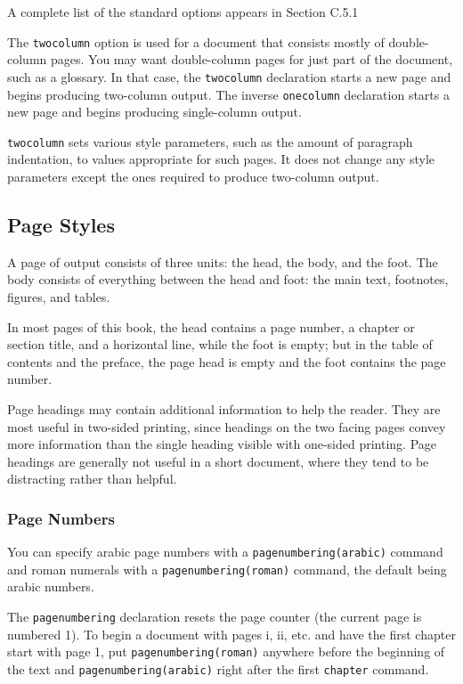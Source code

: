 \documentclass{article}
\begin{document}
A complete list of the standard options appears in Section C.5.1 %

The {\tt twocolumn} option is used for a document that consists mostly of double-column pages. You 
may want double-column pages for just part of the document, such as a glossary. In that case, 
the \verb:twocolumn: declaration starts a new page and begins producing two-column output. 
The inverse \verb:onecolumn: declaration starts a new page and begins producing single-column 
output.

{\tt twocolumn} sets various style parameters, such as the amount of paragraph indentation, to
values appropriate for such pages. It does not change any style parameters except the ones required
to produce two-column output.

\subsection{Page Styles}

A page of output consists of three units: the head, the body, and the foot. The body consists of
everything between the head and foot: the main text, footnotes, figures, and tables.

In most pages of this book, the head contains a page number, a chapter or section title, and a
horizontal line, while the foot is empty; but in the table of contents and the preface, the page
head is empty and the foot contains the page number.

Page headings may contain additional information to help the reader. They are most useful in
two-sided printing, since headings on the two facing pages convey more information than the single
heading visible with one-sided printing. Page headings are generally not useful in a short
document, where they tend to be distracting rather than helpful. 

\subsubsection{Page Numbers}

You can specify arabic page numbers with a \verb:pagenumbering(arabic): 
command and roman numerals with a \verb:pagenumbering(roman): command, the default being arabic 
numbers.

The \verb:pagenumbering: declaration resets the page counter (the current page is numbered 1). 
To begin a document with pages i, ii, etc. and have the first chapter start with page 1, 
put \verb:pagenumbering(roman): anywhere before the beginning of the text and 
\verb:pagenumbering(arabic): right after the first \verb:chapter: command.
\end{document}
